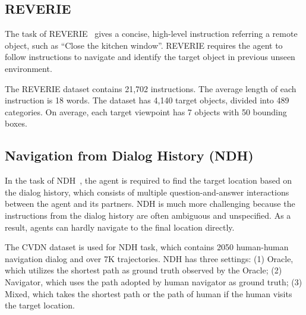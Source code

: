 \documentclass[10pt,twocolumn,letterpaper]{article}
\begin{document}
\vspace{0pt}
\subsection{REVERIE}
The task of REVERIE~\cite{reverie} gives a concise, high-level instruction referring a remote object, such as ``Close the kitchen window''. REVERIE requires the agent to follow instructions to navigate and identify the target object in previous unseen environment.

\vspace{3pt}
The REVERIE dataset contains 21,702 instructions. The average length of each instruction is 18 words. The dataset has 4,140 target objects, divided into 489 categories. On average, each target viewpoint has 7 objects with 50 bounding boxes.

\vspace{3pt}
\subsection{Navigation from Dialog History (NDH)}
In the task of NDH~\cite{ndh}, the agent is required to find the target location based on the dialog history, which consists of multiple question-and-answer interactions between the agent and its partners. NDH is much more challenging because the instructions from the dialog history are often ambiguous and unspecified. As a result, agents can hardly navigate to the final location directly.

\vspace{3pt}
The CVDN dataset is used for NDH task, which contains 2050 human-human navigation dialog and over 7K trajectories. 
NDH has three settings: (1) Oracle, which utilizes the shortest path as ground truth observed by the Oracle; (2) Navigator, which uses  the path adopted by human navigator as ground truth; (3) Mixed, which takes the shortest path or the path of human if the human visits the target location.
\end{document}
